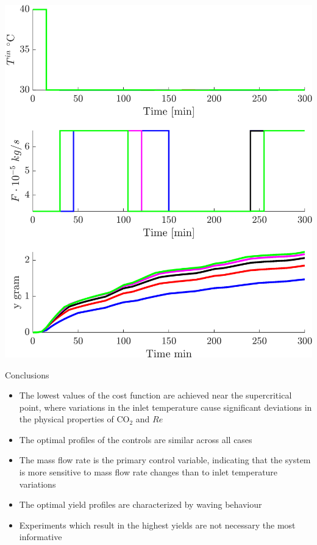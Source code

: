 \documentclass[a0,portrait]{a0poster}
\begin{document}
\begin{multicols}{2}
\begin{tcolorbox}[width=\linewidth, boxrule=0mm, sharp corners=all, colback=white]
	\begin{center}\vspace{0.5cm}
		\includegraphics[width=0.92\linewidth]{Profiles_all.png}
	\end{center}%
	
\end{tcolorbox}


\begin{tcolorbox}[width=\linewidth, boxrule=0mm, sharp corners=all, colback=white]
	{\LARGE Conclusions\\}

	\begin{itemize}
		\item The lowest values of the cost function are achieved near the supercritical point, where variations in the inlet temperature cause significant deviations in the physical properties of CO$_2$ and $Re$
		\item The optimal profiles of the controls are similar across all cases
		\item The mass flow rate is the primary control variable, indicating that the system is more sensitive to mass flow rate changes than to inlet temperature variations
		\item The optimal yield profiles are characterized by waving behaviour 
		\item Experiments which result in the highest yields are not necessary the most informative
	\end{itemize}


\end{tcolorbox}
\end{multicols}
\end{document}
